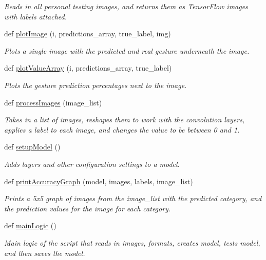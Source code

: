 \begin{DoxyCompactItemize}
\begin{DoxyCompactList}\small\item\em Reads in all personal testing images, and returns them as Tensor\+Flow images with labels attached. \end{DoxyCompactList}\item 
def \hyperlink{namespaceCreateModel_a596ac84e0b693e1daeb598454dc87f74}{plot\+Image} (i, predictions\+\_\+array, true\+\_\+label, img)
\begin{DoxyCompactList}\small\item\em Plots a single image with the predicted and real gesture underneath the image. \end{DoxyCompactList}\item 
def \hyperlink{namespaceCreateModel_aacc54b5b2352d3bc82ddf0d6947f664f}{plot\+Value\+Array} (i, predictions\+\_\+array, true\+\_\+label)
\begin{DoxyCompactList}\small\item\em Plots the gesture prediction percentages next to the image. \end{DoxyCompactList}\item 
def \hyperlink{namespaceCreateModel_a71cf3aed17e6928f553b708b0b71833f}{process\+Images} (image\+\_\+list)
\begin{DoxyCompactList}\small\item\em Takes in a list of images, reshapes them to work with the convolution layers, applies a label to each image, and changes the value to be between 0 and 1. \end{DoxyCompactList}\item 
def \hyperlink{namespaceCreateModel_a4fe88b0b4e6d006ace78866bd98f8553}{setup\+Model} ()
\begin{DoxyCompactList}\small\item\em Adds layers and other configuration settings to a model. \end{DoxyCompactList}\item 
def \hyperlink{namespaceCreateModel_a903f50a90eaf893ccc92d235be6e5a81}{print\+Accuracy\+Graph} (model, images, labels, image\+\_\+list)
\begin{DoxyCompactList}\small\item\em Prints a 5x5 graph of images from the image\+\_\+list with the predicted category, and the prediction values for the image for each category. \end{DoxyCompactList}\item 
def \hyperlink{namespaceCreateModel_a34139424c0de1bb7aaf8f04b931ba11f}{main\+Logic} ()
\begin{DoxyCompactList}\small\item\em Main logic of the script that reads in images, formats, creates model, tests model, and then saves the model. \end{DoxyCompactList}\end{DoxyCompactItemize}
